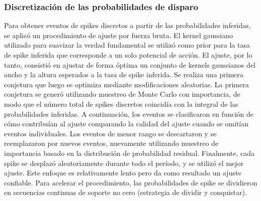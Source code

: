 \subsubsection{Discretización de las probabilidades de disparo}

Para obtener eventos de spikes discretos a partir de las probabilidades inferidas, se aplicó un procedimiento de ajuste por fuerza bruta. El kernel gaussiano utilizado para suavizar la verdad fundamental se utilizó como prior para la tasa de spike inferida que corresponde a un solo potencial de acción. El ajuste, por lo tanto, consistió en ajustar de forma óptima un conjunto de kernels gaussianos del ancho y la altura esperados a la tasa de spike inferida. Se realiza una primera conjetura que luego se optimiza mediante modificaciones aleatorias. La primera conjetura se generó utilizando muestreo de Monte Carlo con importancia, de modo que el número total de spikes discretos coincidía con la integral de las probabilidades inferidas. A continuación, los eventos se clasificaron en función de cómo contribuían al ajuste comparando la calidad del ajuste cuando se omitían eventos individuales. Los eventos de menor rango se descartaron y se reemplazaron por nuevos eventos, nuevamente utilizando muestreo de importancia basado en la distribución de probabilidad residual. Finalmente, cada spike se desplazó aleatoriamente durante todo el período, y se utilizó el mejor ajuste. Este enfoque es relativamente lento pero da como resultado un ajuste confiable. Para acelerar el procedimiento, las probabilidades de spike se dividieron en secuencias continuas de soporte no cero (estrategia de dividir y conquistar). 



